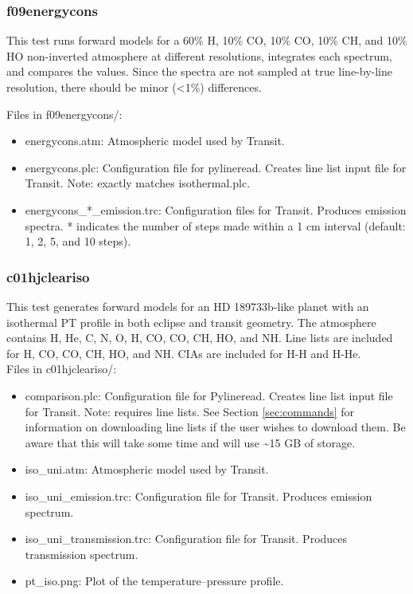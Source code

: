 \documentclass[letterpaper, 12pt]{article}
\begin{document}
\subsubsection{f09energycons}
\label{sec:energycons}
This test runs forward models for a 60\% H, 10\% CO, 10\% CO, 10\% CH, and 10\% HO non-inverted atmosphere at different resolutions, integrates each spectrum, and compares the values. Since the spectra are not sampled at true line-by-line resolution, there should be minor (\textless 1\%) differences.

Files in f09energycons/:
\begin{itemize} \itemsep0pt
  \item energycons.atm: Atmospheric model used by Transit.
  \item energycons.plc: Configuration file for pylineread. Creates 
        line list input file for Transit. Note: exactly matches isothermal.plc.
  \item energycons{\_}*{\_}emission.trc: Configuration files for Transit. Produces 
        emission spectra. * indicates the number of steps made within a 1 cm interval (default: 1, 2, 5, and 10 steps).
\end{itemize}

\subsubsection{c01hjcleariso}
\label{sec:comp-iso}
This test generates forward models for an HD 189733b-like planet with an isothermal PT profile in both eclipse and transit geometry. The atmosphere contains H, He, C, N, O, H, 
CO, CO, CH, HO, and NH. Line lists are 
included for H, CO, CO, CH, HO, and NH. CIAs 
are included for H-H and H-He.\\

Files in c01hjcleariso/:
\begin{itemize} \itemsep0pt
  \item comparison.plc: Configuration file for Pylineread. Creates 
        line list input file for Transit. Note: requires line lists. See 
        Section \ref{sec:commands} for information on downloading line lists if 
        the user wishes to download them. Be aware that this will take some 
        time and will use {\sim}15 GB of storage.
  \item iso{\_}uni.atm: Atmospheric model used by Transit.
  \item iso{\_}uni{\_}emission.trc: Configuration file for Transit. Produces 
        emission spectrum.
  \item iso{\_}uni{\_}transmission.trc: Configuration file for Transit. Produces 
        transmission spectrum.
  \item pt{\_}iso.png: Plot of the temperature--pressure profile.
\end{itemize}
\end{document}

